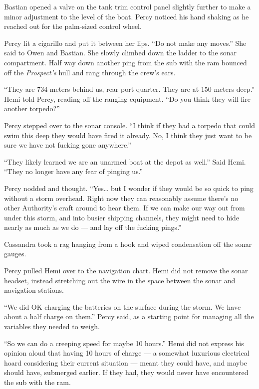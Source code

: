 \documentclass[
]{scrbook}
\begin{document}
Bastian opened a valve on the tank trim control panel slightly further
to make a minor adjustment to the level of the boat. Percy noticed his
hand shaking as he reached out for the palm-sized control wheel.

Percy lit a cigarillo and put it between her lips. ``Do not make any
moves.'' She said to Owen and Bastian. She slowly climbed down the
ladder to the sonar compartment. Half way down another ping from the sub
with the ram bounced off the \emph{Prospect's} hull and rang through the
crew's ears.

``They are 734 meters behind us, rear port quarter. They are at 150
meters deep.'' Hemi told Percy, reading off the ranging equipment. ``Do
you think they will fire another torpedo?''

Percy stepped over to the sonar console. ``I think if they had a torpedo
that could swim this deep they would have fired it already. No, I think
they just want to be sure we have not fucking gone anywhere.''

``They likely learned we are an unarmed boat at the depot as well.''
Said Hemi. ``They no longer have any fear of pinging us.''

Percy nodded and thought. ``Yes\ldots{} but I wonder if they would be so
quick to ping without a storm overhead. Right now they can reasonably
assume there's no other Authority's craft around to hear them. If we can
make our way out from under this storm, and into busier shipping
channels, they might need to hide nearly as much as we do --- and lay
off the fucking pings.''

Cassandra took a rag hanging from a hook and wiped condensation off the
sonar gauges.

Percy pulled Hemi over to the navigation chart. Hemi did not remove the
sonar headset, instead stretching out the wire in the space between the
sonar and navigation stations.

``We did OK charging the batteries on the surface during the storm. We
have about a half charge on them.'' Percy said, as a starting point for
managing all the variables they needed to weigh.

``So we can do a creeping speed for maybe 10 hours.'' Hemi did not
express his opinion aloud that having 10 hours of charge --- a somewhat
luxurious electrical hoard considering their current situation --- meant
they could have, and maybe should have, submerged earlier. If they had,
they would never have encountered the sub with the ram.
\end{document}
